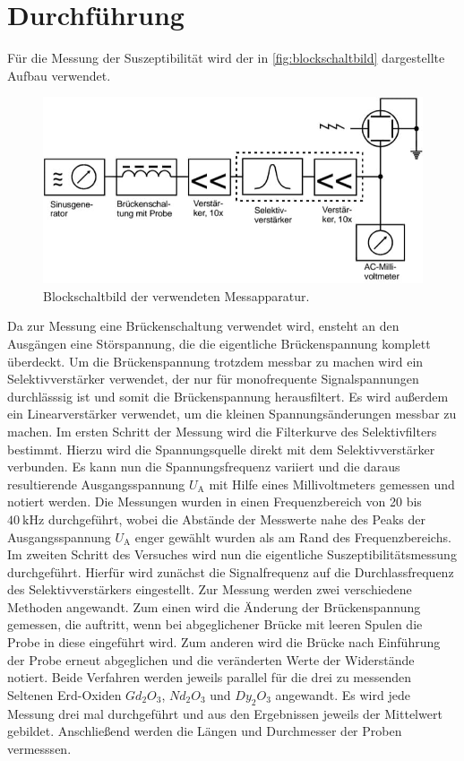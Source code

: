 \section{Durchführung}
\label{sec:Durchführung}
Für die Messung der Suszeptibilität wird der in \autoref{fig:blockschaltbild} dargestellte Aufbau verwendet.

\begin{figure}[H]
	\centering
	\includegraphics[width=0.6\linewidth]{data/blockschaltbild.jpeg}
	\caption{Blockschaltbild der verwendeten Messapparatur.}
	\label{fig:blockschaltbild}
\end{figure}
\noindent
Da zur Messung eine Brückenschaltung verwendet wird, ensteht an den Ausgängen eine Störspannung, die die eigentliche Brückenspannung komplett überdeckt. Um die Brückenspannung
trotzdem messbar zu machen wird ein Selektivverstärker verwendet, der nur für monofrequente Signalspannungen durchlässsig ist und somit die Brückenspannung herausfiltert. Es wird 
außerdem ein Linearverstärker verwendet, um die kleinen Spannungsänderungen messbar zu machen.
\newline \newline
Im ersten Schritt der Messung wird die Filterkurve des Selektivfilters bestimmt. Hierzu wird die Spannungsquelle direkt mit dem Selektivverstärker verbunden. Es kann nun die Spannungsfrequenz
variiert und die daraus resultierende Ausgangsspannung $U_{\text{A}}$ mit Hilfe eines Millivoltmeters gemessen und notiert werden. Die Messungen wurden in einen Frequenzbereich von 20 bis
$\SI{40}{\kilo\hertz}$ durchgeführt, wobei die Abstände der Messwerte nahe des Peaks der Ausgangsspannung $U_{\text{A}}$ enger gewählt wurden als am Rand des Frequenzbereichs.
\newline \newline
Im zweiten Schritt des Versuches wird nun die eigentliche Suszeptibilitätsmessung durchgeführt. Hierfür wird zunächst die Signalfrequenz auf die Durchlassfrequenz des Selektivverstärkers
eingestellt. Zur Messung werden zwei verschiedene Methoden angewandt. Zum einen wird die Änderung der Brückenspannung gemessen, die auftritt, wenn bei abgeglichener Brücke mit leeren Spulen
die Probe in diese eingeführt wird. Zum anderen wird die Brücke nach Einführung der Probe erneut abgeglichen und die veränderten Werte der Widerstände notiert.
\newline
Beide Verfahren werden jeweils parallel für die drei zu messenden Seltenen Erd-Oxiden $Gd_2O_3$, $Nd_2O_3$ und $Dy_2O_3$ angewandt. Es wird jede Messung drei mal durchgeführt und aus den
Ergebnissen jeweils der Mittelwert gebildet. Anschließend werden die Längen und Durchmesser der Proben vermesssen.
